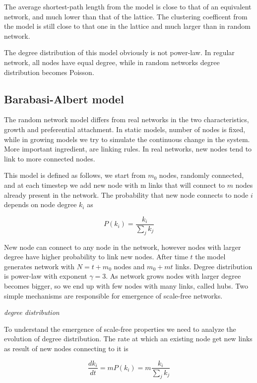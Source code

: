 The average shortest-path length from the model is close to that of an equivalent network, and much lower than that of the lattice. The clustering coefficent from the model is still close to that one in the lattice and much larger than in random network. 

The degree distribution of this model obviously is not power-law. In regular network, all nodes have equal degree, while in random networks degree distribution becomes Poisson. 

\subsection{Barabasi-Albert model}

The random network model differs from real networks in the two characteristics, growth and preferential attachment. In static models, number of nodes is fixed, while in growing models we try to simulate the continuous change in the system. More important ingredient, are linking rules. In real networks, new nodes tend to link to more connected nodes.

This model is defined as follows, we start from $m_0$ nodes, randomly connected, and at each timestep we add new node with m links that will connect to $m$ nodes already present in the network.  The probability that new node connects to node $i$ depends on node degree $k_i$ as

\begin{equation}
P(k_i) = \frac{k_i}{\sum_jk_j} 
\end{equation} 

New node can connect to any node in the network, however nodes with larger degree have higher probability to link new nodes. After time $t$ the model generates network with $N=t+m_0$ nodes and $m_0+mt$ links. Degree distribution is power-law with exponent $\gamma=3$. As network grows nodes with larger degree becomes bigger, so we end up with few nodes with many links, called hubs. Two simple mechanisms are responsible for emergence of scale-free networks. 

 \textit{degree distribution}
 
To understand the emergence of scale-free properties we need to analyze the evolution of degree distribution. The rate at which an existing node get new links as result of new nodes connecting to it is

\begin{equation}
\frac{dk_i}{dt} = mP(k_i) = m\frac{k_i}{\sum_jk_j}
\end{equation}

